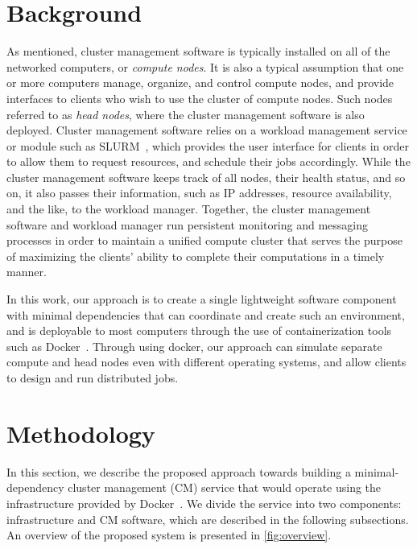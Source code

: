 \documentclass[sigconf]{acmart}
\begin{document}
\section{Background}

As mentioned, cluster management software is typically installed on all of the networked computers, or \textit{compute nodes}. 
It is also a typical assumption that one or more computers manage, organize, and control compute nodes, and provide interfaces
to clients who wish to use the cluster of compute nodes. Such nodes referred to as \textit{head nodes}, where the cluster
management software is also deployed.
Cluster management software relies on a workload management service or module such as SLURM~\cite{yoo2003slurm}, which provides 
the user interface for clients in order to allow them to request resources, and schedule their jobs accordingly.
While the cluster management software keeps track of all nodes, their health status, and so on, it also passes their
information, such as IP addresses, resource availability, and the like, to the workload manager.
Together, the cluster management software and workload manager run persistent monitoring and messaging processes in order to
maintain a unified compute cluster that serves the purpose of maximizing the clients' ability to complete their computations in
a timely manner. 

In this work, our approach is to create a single lightweight software component with minimal dependencies that can coordinate
and create such an environment, and is deployable to most computers through the use of containerization tools such as
Docker~\cite{merkel2014docker}. Through using docker, our approach can simulate separate compute and head nodes even with
different operating systems, and allow clients to design and run distributed jobs.


\section{Methodology}

In this section, we describe the proposed approach towards building a minimal-dependency cluster management (CM) service that
would operate using the infrastructure provided by Docker~\cite{merkel2014docker}.
We divide the service into two components: infrastructure and CM software, which are described in the following subsections.
An overview of the proposed system is presented in \cref{fig:overview}.
\end{document}
